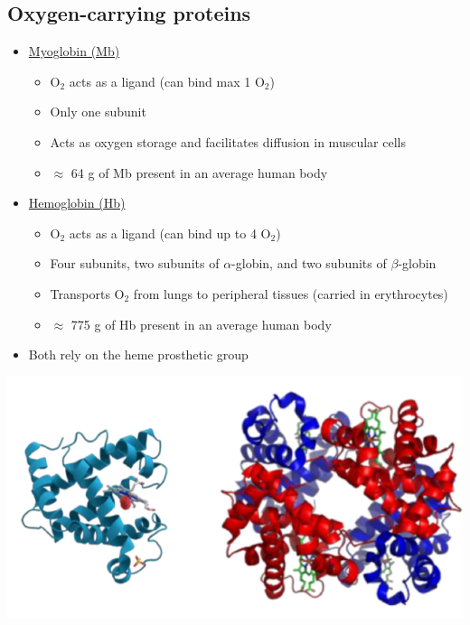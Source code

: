 \documentclass[10pt]{article}
\begin{document}
\subsection*{Oxygen-carrying proteins}
\begin{itemize}
    \item \underline{Myoglobin (Mb)}
    \begin{itemize}
        \item O$_2$ acts as a ligand (can bind max 1 O$_2$)
        \item Only one subunit
        \item Acts as oxygen storage and facilitates diffusion in muscular cells
        \item $\approx$ 64 g of Mb present in an average human body
    \end{itemize}
    \item \underline{Hemoglobin (Hb)}
    \begin{itemize}
        \item O$_2$ acts as a ligand (can bind up to 4 O$_2$)
        \item Four subunits, two subunits of $\alpha$-globin, and two subunits of $\beta$-globin
        \item Transports O$_2$ from lungs to peripheral tissues (carried in erythrocytes)
        \item $\approx$ 775 g of Hb present in an average human body
    \end{itemize}
    \item Both rely on the heme prosthetic group
\end{itemize}
\begin{center}
    \includegraphics*[scale=0.5]{L1_19.png}
\end{center}

\pagebreak
\end{document}
